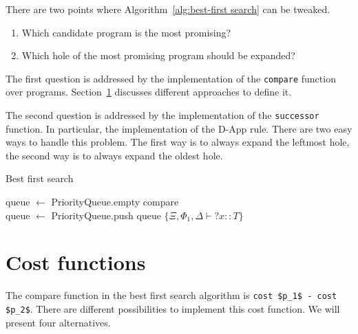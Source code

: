 There are two points where Algorithm~\ref{alg:best-first search} can be tweaked.
\begin{enumerate}
\item Which candidate program is the most promising?
\item Which hole of the most promising program should be expanded?
\end{enumerate}
The first question is addressed by the implementation of the \lstinline?compare? function over programs. Section~\ref{Cost functions} discusses different approaches to define it.

The second question is addressed by the implementation of the \lstinline?successor? function. In particular, the implementation of the D-App rule. There are two easy ways to handle this problem. The first way is to always expand the leftmost hole, the second way is to always expand the oldest hole.

\begin{algorithm}
\caption{Best first search\label{alg:best-first search}}

queue $\gets$ PriorityQueue.empty {\color{blue}compare}\\
queue $\gets$ PriorityQueue.push queue $\{\Xi, \Phi_1, \Delta \vdash {?x} :: T\}$\\

\end{algorithm}

\section{Cost functions}\label{Cost functions}
The compare function in the best first search algorithm is \lstinline?cost $p_1$ - cost $p_2$?. There are different possibilities to implement this cost function. We will present four alternatives.

